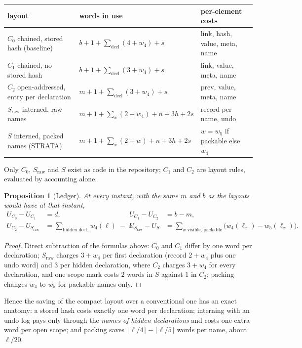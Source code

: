 \documentclass[11pt,a4paper]{article}
\newtheorem{proposition}[theorem]{Proposition}
\theoremstyle{definition}
\theoremstyle{remark}
\newcommand{\st}{STRATA}
\newcommand{\ceil}[1]{\lceil #1\rceil}
\begin{document}
\begin{center}\footnotesize
\setlength{\tabcolsep}{4pt}
\begin{tabular}{@{}lll@{}}
\toprule
layout & words in use & per-element costs\\
\midrule
$C_0$ chained, stored hash (baseline) & $b+1+\sum\nolimits_{\text{decl}}(4+w_4)+s$ & link, hash, value, meta, name\\
$C_1$ chained, no stored hash & $b+1+\sum\nolimits_{\text{decl}}(3+w_4)+s$ & link, value, meta, name\\
$C_2$ open-addressed, entry per declaration & $m+1+\sum\nolimits_{\text{decl}}(3+w_4)+s$ & prev, value, meta, name\\
$S_{\mathrm{raw}}$ interned, raw names & $m+1+\sum\nolimits_{x}(2+w_4)+n+3h+2s$ & record per name, undo\\
$S$ interned, packed names (\st) & $m+1+\sum\nolimits_{x}(2+w)+n+3h+2s$ & $w=w_5$ if packable else $w_4$\\
\bottomrule
\end{tabular}
\end{center}

Only $C_0$, $S_{\mathrm{raw}}$ and $S$ exist as code in the repository; $C_1$ and $C_2$ are layout rules, evaluated by accounting alone.

\begin{proposition}[Ledger]\label{prop:ledger}
At every instant, with the same $m$ and $b$ as the layouts would have at that instant,
\begin{align*}
U_{C_0}-U_{C_1}&=d, & U_{C_1}-U_{C_2}&=b-m,\\
U_{C_2}-U_{S_{\mathrm{raw}}}&=\sum_{\text{hidden decl.}}w_4(\ell)\;-\;s, &
U_{S_{\mathrm{raw}}}-U_{S}&=\sum_{x\text{ visible, packable}}\bigl(w_4(\ell_x)-w_5(\ell_x)\bigr).
\end{align*}
\end{proposition}
\begin{proof}
Direct subtraction of the formulas above: $C_0$ and $C_1$ differ by one word per declaration; $S_{\mathrm{raw}}$ charges $3+w_4$ per first declaration (record $2+w_4$ plus one undo word) and $3$ per hidden declaration, where $C_2$ charges $3+w_4$ for every declaration, and one scope mark costs $2$ words in $S$ against $1$ in $C_2$; packing changes $w_4$ to $w_5$ for packable names only.
\end{proof}

Hence the saving of the compact layout over a conventional one has an exact anatomy: a stored hash costs exactly one word per declaration; interning with an undo log pays only through the \emph{names of hidden declarations} and costs one extra word per open scope; and packing saves $\ceil{\ell/4}-\ceil{\ell/5}$ words per name, about $\ell/20$.
\end{document}
